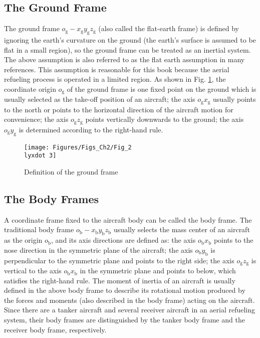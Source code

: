 \subsection{The Ground Frame}

The ground frame ${{o}_{\text{g}}}-{{x}_{\text{g}}}{{y}_{\text{g}}}{{z}_{\text{g}}}$
(also called the flat-earth frame) is defined by ignoring the earth\textquoteright s
curvature on the ground (the earth\textquoteright s surface is assumed
to be flat in a small region), so the ground frame can be treated
as an inertial system. The above assumption is also referred to as
the flat earth assumption in many references. This assumption is reasonable
for this book because the aerial refueling process is operated in
a limited region. As shown in Fig. \ref{Fig_2.3}, the coordinate
origin ${{o}_{\text{g}}}$ of the ground frame is one fixed point
on the ground which is usually selected as the take-off position of
an aircraft; the axis ${{o}_{\text{g}}}{{x}_{\text{g}}}$ usually
points to the north or points to the horizontal direction of the aircraft
motion for convenience; the axis ${{o}_{\text{g}}}{{z}_{\text{g}}}$
points vertically downwards to the ground; the axis ${{o}_{\text{g}}}{{y}_{\text{g}}}$
is determined according to the right-hand rule.

\begin{figure}
	\begin{centering}
		\texttt{[image: Figures/Figs\_Ch2/Fig\_2\\lyxdot 3]}
		\par\end{centering}
	\caption{Definition of the ground frame}
	
	\centering{}\label{Fig_2.3}
\end{figure}


\subsection{The Body Frames}

A coordinate frame fixed to the aircraft body can be called the body
frame. The traditional body frame ${{o}_{\text{b}}}-{{x}_{\text{b}}}{{y}_{\text{b}}}{{z}_{\text{b}}}$
usually selects the mass center of an aircraft as the origin ${{o}_{\text{b}}}$,
and its axis directions are defined as: the axis ${{o}_{\text{b}}}{{x}_{\text{b}}}$
points to the nose direction in the symmetric plane of the aircraft;
the axis ${{o}_{\text{b}}}{{y}_{\text{b}}}$ is perpendicular to the
symmetric plane and points to the right side; the axis ${{o}_{\text{g}}}{{z}_{\text{g}}}$
is vertical to the axis ${{o}_{\text{b}}}{{x}_{\text{b}}}$ in the
symmetric plane and points to below, which satisfies the right-hand
rule. The moment of inertia of an aircraft is usually defined in the
above body frame to describe its rotational motion produced by the
forces and moments (also described in the body frame) acting on the
aircraft. Since there are a tanker aircraft and several receiver aircraft
in an aerial refueling system, their body frames are distinguished
by the tanker body frame and the receiver body frame, respectively.


